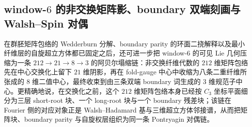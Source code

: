 \subsection{window-\texorpdfstring{$6$}{6} 的非交换矩阵影、boundary 双端刻画与 Walsh--Spin 对偶}\label{subsec:conclusion-window6-matrix-shadow-boundary-walsh-duality}
在群胚矩阵包络的 Wedderburn 分解、boundary parity 的环面二挠解释以及最小纤维层的自旋超立方体都已固定之后，还可进一步把 window-\(6\) 的可见 Lie 几何压缩为一条 \(212\to 21\to 8\to 3\) 的阿贝尔塌缩链：非交换纤维代数的 \(212\) 维矩阵包络先在中心交换化上留下 \(21\) 维阴影，再在 fold-gauge 中心中收缩为八条二重纤维所张成的 \(8\) 维二值中心，最终收束到由三条双端 boundary 词生成的 \(3\) 维规范子中心。更精确地说，在交换化之前，这个 \(212\) 维矩阵包络本身已经按 \(C_3\) 坐标平面细分为三层 short-root 块、一个 long-root 块与一个 boundary 残差块；该链在 Fourier 侧的对应对象正是 Walsh--Hadamard 基与三维超立方体邻接谱，从而把矩阵块、boundary parity 与自旋权层组织为同一条 Pontryagin 对偶链。

